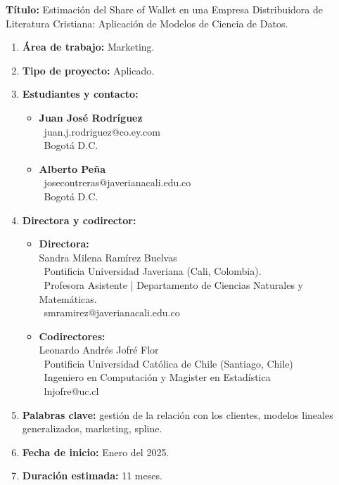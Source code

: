 
\vspace{-1cm}
\textbf{Título:} Estimación del Share of Wallet en una Empresa Distribuidora de Literatura Cristiana: Aplicación de Modelos de Ciencia de Datos.


\begin{enumerate}
    \item \textbf{Área de trabajo:} Marketing.
    \item \textbf{Tipo de proyecto:} Aplicado.
    \item \textbf{Estudiantes y contacto:}
        \begin{itemize}
        \item \textbf{ Juan José Rodríguez} \\
        \faEnvelope\ juan.j.rodriguez@co.ey.com 
        \\
        \faMapMarker\ Bogotá D.C.
        
        \item \textbf{Alberto Peña} \\
        \faEnvelope\ josecontreras@javerianacali.edu.co 
        \\
        \faMapMarker\ Bogotá D.C.
        \end{itemize}
        \vspace{-0.3cm}
    \item \textbf{Directora y codirector:} 
    \begin{itemize}
    \item \textbf{Directora:} \\ 
        Sandra Milena Ramírez Buelvas  \\
        \faUniversity\ Pontificia Universidad Javeriana (Cali, Colombia). \\
        \faPaperclip\ Profesora Asistente | Departamento de Ciencias Naturales y Matemáticas. \\
        \faEnvelope\ smramirez@javerianacali.edu.co
    \item \textbf{Codirectores:} \\ 
       Leonardo Andrés Jofré Flor \\
        \faUniversity\ Pontificia Universidad Católica de Chile (Santiago, Chile)  \\
        \faPaperclip\ Ingeniero en Computación y Magister en Estadística  \\
        \faEnvelope\ lnjofre@uc.cl 
                
    \end{itemize}
    \vspace{-0.3cm}
    \item \textbf{Palabras clave:} gestión de la relación con los clientes, modelos lineales generalizados, marketing, spline.

    \item \textbf{Fecha de inicio:} Enero del 2025.

    \item \textbf{Duración estimada:} 11 meses.

\end{enumerate}